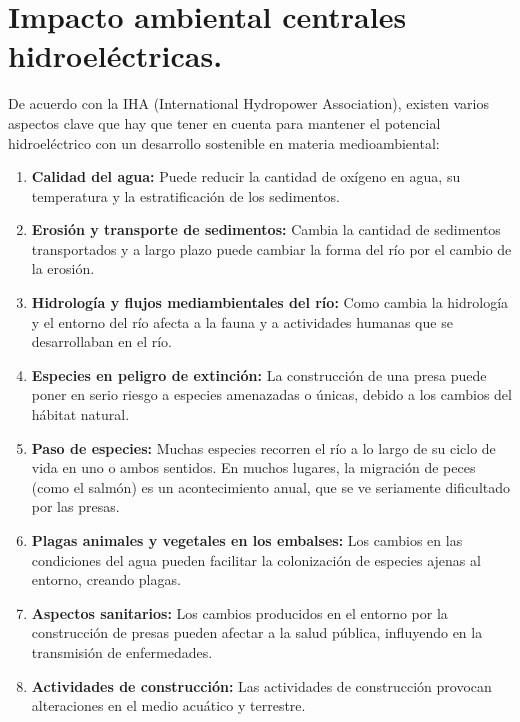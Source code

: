 \section{Impacto ambiental centrales hidroeléctricas.}
De acuerdo con la IHA (International Hydropower Association), existen varios aspectos clave que hay que tener en
cuenta para mantener el potencial hidroeléctrico con un desarrollo sostenible en materia medioambiental:
\begin{enumerate}
	\item \textbf{Calidad del agua:} Puede reducir la cantidad de oxígeno en agua, su temperatura y la estratificación de los sedimentos.
	\item \textbf{Erosión y transporte de sedimentos:} Cambia la cantidad de sedimentos transportados y a largo plazo puede cambiar la forma del río por el cambio de la erosión.
	\item \textbf{Hidrología y flujos mediambientales del río:} Como cambia la hidrología y el entorno del río afecta a la fauna y a actividades humanas que se desarrollaban en el río.
	\item \textbf{Especies en peligro de extinción:}  La construcción de una presa puede poner en serio riesgo a especies amenazadas o únicas, debido a los
	cambios del hábitat natural.
	\item \textbf{Paso de especies:} Muchas especies recorren el río a lo largo de su ciclo de vida en uno o ambos sentidos. En muchos lugares,
	la migración de peces (como el salmón) es un acontecimiento anual, que se ve seriamente dificultado por las
	presas.
	\item \textbf{Plagas animales y vegetales en los embalses:} Los cambios en las condiciones del agua pueden facilitar la colonización de especies
	ajenas al entorno, creando plagas.
	\item \textbf{Aspectos sanitarios:} Los cambios producidos en el entorno por la construcción de presas pueden afectar a la salud pública,
	influyendo en la transmisión de enfermedades.
	\item \textbf{Actividades de construcción:} Las actividades de construcción provocan alteraciones en el medio acuático y terrestre.
\end{enumerate}

